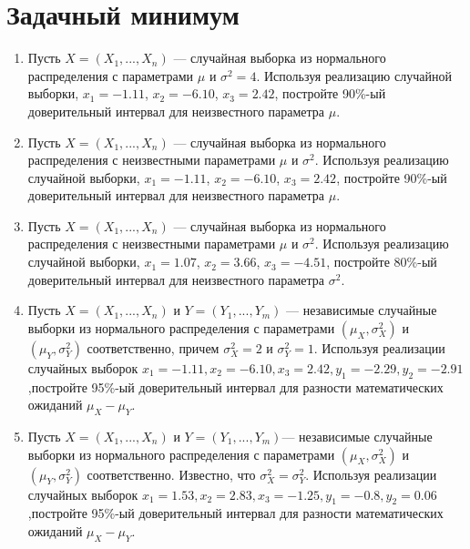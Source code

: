 \documentclass[12pt]{article}
\begin{document}
\section{Задачный минимум}



\begin{enumerate}

\item Пусть $X = (X_{1},..., X_{n})$  — случайная выборка из нормального
распределения с параметрами $\mu$ и ${\sigma}^2 = 4$. Используя реализацию случайной выборки, $x_{1} = -1.11$, $x_{2} = -6.10$, $x_{3} =  2.42$, постройте 90\%-ый доверительный интервал для неизвестного параметра $\mu$.

\item Пусть $X = (X_{1},..., X_{n})$ — случайная выборка из нормального распределения с неизвестными параметрами $\mu$ и ${\sigma}^2$. Используя реализацию случайной выборки, $x_{1} = -1.11$, $x_{2} = -6.10$, $x_{3} = 2.42$, постройте 90\%-ый доверительный интервал для неизвестного параметра $\mu$.

\item Пусть $X = (X_{1},..., X_{n})$ — случайная выборка из нормального распределения с неизвестными параметрами $\mu$ и ${\sigma}^2$. Используя реализацию случайной выборки, $x_{1} = 1.07$, $x_{2} = 3.66$, $x_{3} = -4.51$, постройте 80\%-ый доверительный интервал для неизвестного параметра ${\sigma}^2$.

\item Пусть $X = (X_{1},..., X_{n})$ и $Y = (Y_{1},..., Y_{m})$ — независимые случайные выборки из нормального распределения с параметрами $(\mu_{X},{\sigma^2_{X}})$ и $(\mu_{Y},{\sigma^2_{Y}})$ соответственно, причем $\sigma^2_{X} = 2$ и $\sigma^2_{Y} = 1$. Используя реализации случайных выборок\newline
\hspace*{3cm}$x_{1} = -1.11, x_{2} = -6.10, x_{3} = 2.42, y_{1} = -2.29, y_{2} = -2.91$,\newline постройте 95\%-ый доверительный интервал для разности математических ожиданий $\mu_{X} - \mu_{Y}$.

\item Пусть $X = (X_{1},..., X_{n})$ и $Y = (Y_{1},..., Y_{m})$— независимые случайные выборки из нормального распределения с параметрами $(\mu_{X},{\sigma^2_{X}})$ и $(\mu_{Y},{\sigma^2_{Y}})$ соответственно. Известно, что $\sigma^2_{X} = \sigma^2_{Y}$. Используя реализации случайных выборок\newline
\hspace*{3cm}$x_{1} = 1.53, x_{2} = 2.83, x_{3} = -1.25, y_{1} = -0.8, y_{2} = 0.06$,\newline постройте 95\%-ый доверительный интервал для разности математических ожиданий $\mu_{X} - \mu_{Y}$.


\end{enumerate}
\end{document}
